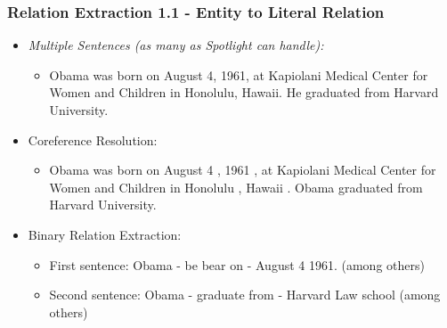 \documentclass{beamer}
\begin{document}
\begin{frame}
\frametitle{Relation Extraction 1.1 - Entity to Literal Relation}
\begin{example}[]
	\begin{itemize}
		\item \textit{Multiple Sentences (as many as Spotlight can handle):} \\
		\begin{itemize} \item Obama was born on August 4, 1961, at Kapiolani Medical Center for Women and Children in Honolulu, Hawaii. He graduated from Harvard University.
		\end{itemize}
		\item Coreference Resolution:  \begin{itemize} \item Obama was born on August 4 , 1961 , at Kapiolani Medical Center for Women and Children in Honolulu , Hawaii . Obama graduated from Harvard University. 
		\end{itemize}
	\item Binary Relation Extraction:  \begin{itemize} \item First sentence: Obama - be bear on - August 4 1961. (among others)
    \item Second sentence: Obama - graduate from - Harvard Law school (among others)
	\end{itemize}	 
	\end{itemize}
\end{example}
\end{frame}
\end{document}
